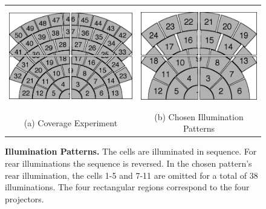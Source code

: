 \begin{figure}
\centering
\begin{tabular}{cc}
\includegraphics[height=1.7in]{figures_pami/coverage_experiment_asplode.png} &
\includegraphics[height=1.7in]{figures_pami/final_cvpr_illuminations_asplode.png}  \\
(a) Coverage Experiment & (b) Chosen Illumination Patterns
\end{tabular}
\caption{\small{\bf Illumination Patterns.}   The cells are illuminated in sequence.  For rear illuminations the sequence is reversed.  In the chosen pattern's rear illumination, the cells 1-5 and 7-11 are omitted for a total of 38 illuminations. The four rectangular regions correspond to the four projectors.  }
\label{fig:illumination-patterns}
\end{figure}


